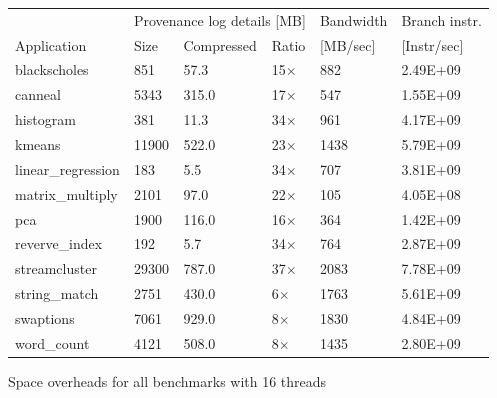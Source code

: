 \begin{figure}[t]
\centering
\myfontsize
{
\begin{tabular}{m{1.6cm}|m{.8cm}|m{1.1cm}|m{.6cm}|m{1.2cm}|m{1.2cm}}
       & \multicolumn{3}{c|}{ Provenance log details [MB] }   &  Bandwidth & Branch instr. \\
   { Application} & Size & Compressed & Ratio & [MB/sec] &  [Instr/sec] \\
  \hline \hline
    blackscholes& 851& 57.3 &15$\times$& 882& 2.49E+09 \\
    canneal& 5343& 315.0 & 17$\times$& 547& 1.55E+09 \\
    histogram& 381& 11.3 & 34$\times$& 961& 4.17E+09 \\
    kmeans& 11900& 522.0 &23$\times$& 1438& 5.79E+09 \\
    linear\_regression& 183& 5.5 &34$\times$& 707& 3.81E+09 \\
    matrix\_multiply& 2101& 97.0 &22$\times$& 105& 4.05E+08 \\
    pca& 1900& 116.0 &16$\times$& 364& 1.42E+09 \\
    reverve\_index& 192& 5.7 & 34$\times$& 764& 2.87E+09 \\
    streamcluster& 29300& 787.0 &37$\times$& 2083& 7.78E+09 \\
    string\_match& 2751& 430.0 &6$\times$& 1763& 5.61E+09 \\
    swaptions& 7061& 929.0 &8$\times$& 1830& 4.84E+09 \\
    word\_count& 4121& 508.0 & 8$\times$& 1435& 2.80E+09 \\

\hline
\end{tabular}
}


\caption{\label{tab:space-overheads} Space overheads for all benchmarks with 16 threads}


\end{figure}
